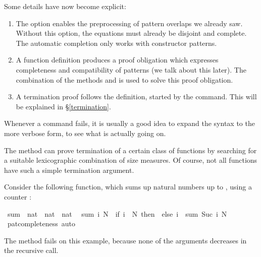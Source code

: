 \begin{isabellebody}
\begin{isamarkuptext}
  \vspace*{1em}
  \noindent Some details have now become explicit:

  \begin{enumerate}
  \item The  option enables the preprocessing of
  pattern overlaps we already saw. Without this option, the equations
  must already be disjoint and complete. The automatic completion only
  works with constructor patterns.

  \item A function definition produces a proof obligation which
  expresses completeness and compatibility of patterns (we talk about
  this later). The combination of the methods  and
   is used to solve this proof obligation.

  \item A termination proof follows the definition, started by the
   command. This will be explained in \S\ref{termination}.
 \end{enumerate}
  Whenever a  command fails, it is usually a good idea to
  expand the syntax to the more verbose  form, to see
  what is actually going on.%
\end{isamarkuptext}%
\isamarkuptrue%
%
\isamarkuptrue%
%
\begin{isamarkuptext}%
\label{termination}
  The  method can prove termination of a
  certain class of functions by searching for a suitable lexicographic
  combination of size measures. Of course, not all functions have such
  a simple termination argument.%
\end{isamarkuptext}%
\isamarkuptrue%
%
\isamarkuptrue%
%
\begin{isamarkuptext}%
Consider the following function, which sums up natural numbers up to
  , using a counter :%
\end{isamarkuptext}%
\isamarkuptrue%
\isamarkupfalse%
\ sum\ {\isacharcolon}{\isacharcolon}\ {\isachardoublequoteopen}nat\ {\isasymRightarrow}\ nat\ {\isasymRightarrow}\ nat{\isachardoublequoteclose}\isanewline
{}\isanewline
\ \ {\isachardoublequoteopen}sum\ i\ N\ {\isacharequal}\ {\isacharparenleft}if\ i\ {\isachargreater}\ N\ then\ {}\ else\ i\ {\isacharplus}\ sum\ {\isacharparenleft}Suc\ i{\isacharparenright}\ N{\isacharparenright}{\isachardoublequoteclose}\isanewline
%
\isadelimproof
%
\endisadelimproof
%
\isatagproof
{}\isamarkupfalse%
\ pat{\isacharunderscore}completeness\ auto%
\endisatagproof
{\isafoldproof}%
%
\isadelimproof
%
\endisadelimproof
%
\begin{isamarkuptext}%
\noindent The  method fails on this example, because none of the
  arguments decreases in the recursive call.


\end{isamarkuptext}
\end{isabellebody}
